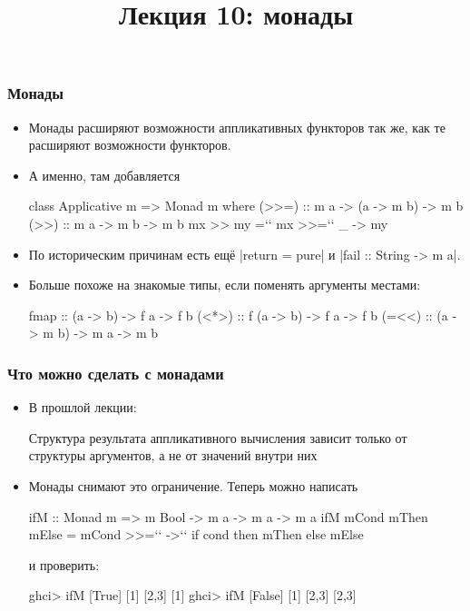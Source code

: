 \documentclass[11pt]{beamer}
\title{Лекция 10: монады}
\begin{document}
\begin{frame}[plain]
  \maketitle
\end{frame}

\begin{frame}[fragile]
  \frametitle{Монады}
  \begin{itemize}
    \item Монады расширяют возможности аппликативных функторов так же, как те расширяют возможности функторов.
    \item А именно, там добавляется
          \begin{haskell}
    class Applicative m => Monad m where
      (>>=) :: m a -> (a -> m b) -> m b
      (>>) :: m a -> m b -> m b
      mx >> my =`\pause` mx >>=`\pause` \_ -> my
    \end{haskell}
          \pause
    \item По историческим причинам есть ещё \haskinline|return = pure| и \haskinline|fail :: String -> m a|.
          \pause
    \item Больше похоже на знакомые типы, если поменять аргументы местами:
          \begin{haskell}
    fmap  ::   (a -> b) -> f a -> f b
    (<*>) :: f (a -> b) -> f a -> f b
    (=<<) :: (a -> m b) -> m a -> m b
    \end{haskell}
  \end{itemize}
\end{frame}

\begin{frame}[fragile]
  \frametitle{Что можно сделать с монадами}
  \begin{itemize}
    \item В прошлой лекции:
          \begin{displayquote}
            Структура результата аппликативного вычисления зависит только от структуры аргументов, а не от значений внутри них
          \end{displayquote}
    \item Монады снимают это ограничение. Теперь можно написать
          \begin{haskell}
    ifM :: Monad m => m Bool -> m a -> m a -> m a
    ifM mCond mThen mElse = mCond >>=`\pause` \cond ->`\pause` 
      if cond then mThen else mElse
    \end{haskell}
          и проверить:
          \begin{haskell}
    ghci> ifM [True] [1] [2,3]
    [1]
    ghci> ifM [False] [1] [2,3]
    [2,3]
    \end{haskell}
  \end{itemize}
\end{frame}
\end{document}
